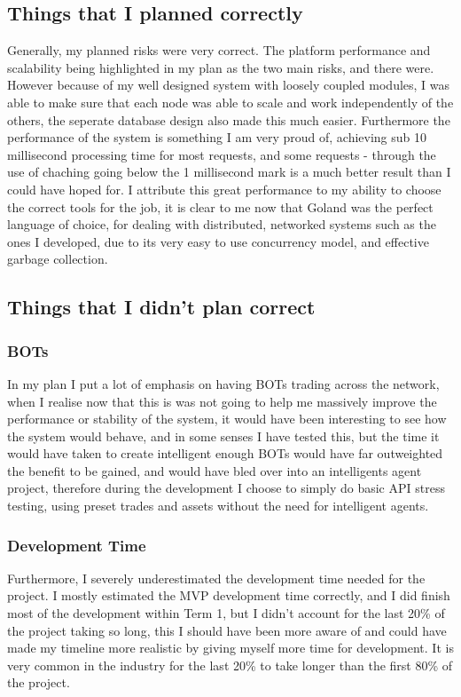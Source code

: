 \documentclass[titlepage]{article}
\begin{document}
\subsection{Things that I planned correctly}
Generally, my planned risks were very correct. The platform performance and scalability being highlighted in my plan as the two main risks, and there were. However because of my well designed system with loosely coupled modules, I was able to make sure that each node was able to scale and work independently of the others, the seperate database design also made this much easier. Furthermore the performance of the system is something I am very proud of, achieving sub 10 millisecond processing time for most requests, and some requests - through the use of chaching going below the 1 millisecond mark is a much better result than I could have hoped for. I attribute this great performance to my ability to choose the correct tools for the job, it is clear to me now that Goland was the perfect language of choice, for dealing with distributed, networked systems such as the ones I developed, due to its very easy to use concurrency model, and effective garbage collection. \\

\subsection{Things that I didn't plan correct}

\subsubsection{BOTs}
In my plan I put a lot of emphasis on having BOTs trading across the network, when I realise now that this is was not going to help me massively improve the performance or stability of the system, it would have been interesting to see how the system would behave, and in some senses I have tested this, but the time it would have taken to create intelligent enough BOTs would have far outweighted the benefit to be gained, and would have bled over into an intelligents agent project, therefore during the development I choose to simply do basic API stress testing, using preset trades and assets without the need for intelligent agents. \\

\subsubsection{Development Time}
Furthermore, I severely underestimated the development time needed for the project. I mostly estimated the MVP development time correctly, and I did finish most of the development within Term 1, but I didn't account for the last 20\% of the project taking so long, this I should have been more aware of and could have made my timeline more realistic by giving myself more time for development. It is very common in the industry for the last 20\% to take longer than the first 80\% of the project.
\end{document}
